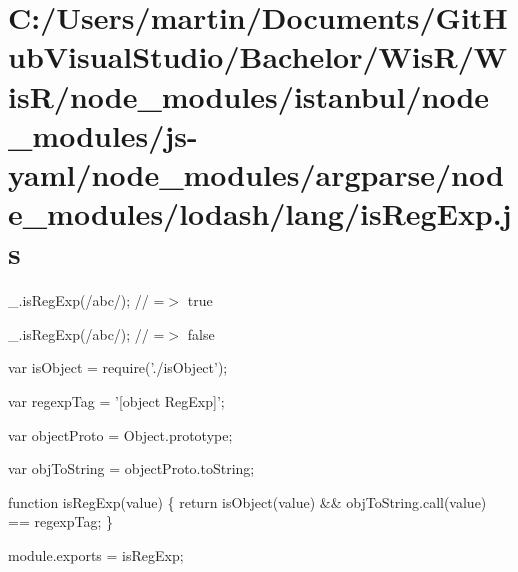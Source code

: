 \hypertarget{_c_1_2_users_2martin_2_documents_2_git_hub_visual_studio_2_bachelor_2_wis_r_2_wis_r_2node_module6c9c3bdf88c41a9145ee19b0c7a03f99}{}\section{C\+:/\+Users/martin/\+Documents/\+Git\+Hub\+Visual\+Studio/\+Bachelor/\+Wis\+R/\+Wis\+R/node\+\_\+modules/istanbul/node\+\_\+modules/js-\/yaml/node\+\_\+modules/argparse/node\+\_\+modules/lodash/lang/is\+Reg\+Exp.\+js}
\+\_\+.\+is\+Reg\+Exp(/abc/); // =$>$ true

\+\_\+.\+is\+Reg\+Exp(\textquotesingle{}/abc/\textquotesingle{}); // =$>$ false


\begin{DoxyCodeInclude}
var isObject = require(\textcolor{stringliteral}{'./isObject'});

var regexpTag = \textcolor{stringliteral}{'[object RegExp]'};

var objectProto = Object.prototype;

var objToString = objectProto.toString;

\textcolor{keyword}{function} isRegExp(value) \{
  \textcolor{keywordflow}{return} isObject(value) && objToString.call(value) == regexpTag;
\}

module.exports = isRegExp;
\end{DoxyCodeInclude}
 